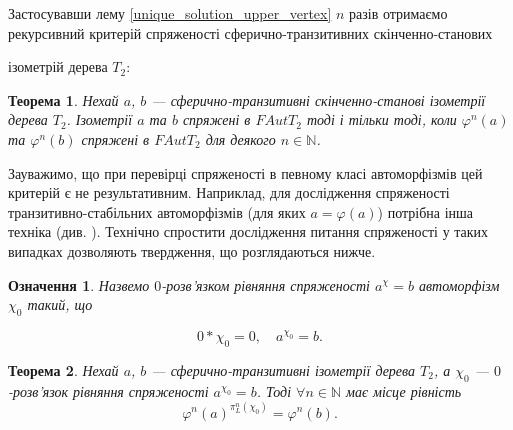 \documentclass[a4paper,12pt]{article} \usepackage{a4wide}
\numberwithin{equation}{subsection}
\newtheorem{theorem}{Теорема}[subsection]
\newtheorem{definition}{Означення}[subsection]
\begin{document}
Застосувавши лему \ref{unique_solution_upper_vertex} $n$ разів отримаємо рекурсивний критерій спряженості сферично-транзитивних скінченно-станових


  ізометрій дерева $T_2$:
\begin{theorem}\label{conj_null_full_izom}
  Нехай $a$, $b$ --- сферично-транзитивні скінченно-станові
  ізометрії дерева $T_2$. Ізометрії $a$ та $b$ спряжені в $FAutT_2$ тоді і
  тільки тоді, коли $\varphi^n(a)$ та $\varphi^n(b)$ спряжені в
  $FAutT_2$ для деякого $n \in \mathbb{N}$.
\end{theorem}


Зауважимо, що при перевірці спряженості в певному класі автоморфізмів цей критерій є не результативним. Наприклад, для дослідження спряженості транзитивно-стабільних автоморфізмів (для яких $a = \varphi(a) $) потрібна інша техніка (див. \cite{M_2}). Технічно спростити дослідження питання спряженості у таких випадках дозволяють твердження, що розглядаються нижче.

\begin{definition}
  Назвемо $0$-розв'язком рівняння спряженості $ a^{\chi}=b$ автоморфізм $\chi_0$ такий, що


$$0*\chi_0 = 0,\quad a^{\chi_0}=b. $$
\end{definition}

  \begin{theorem}\label{null_conj_root}
    Нехай $a$, $b$ --- сферично-транзитивні  ізометрії
    дерева $T_2$, а $\chi_0$ --- $0$-розв'язок рівняння спряженості
    $a^{\chi_0}=b$. Тоді $\forall n \in \mathbb{N}$ має місце
    рівність $$\varphi^n(a)^{\pi_L^n(\chi_0)}=\varphi^n(b). $$
  \end{theorem}
\end{document}
